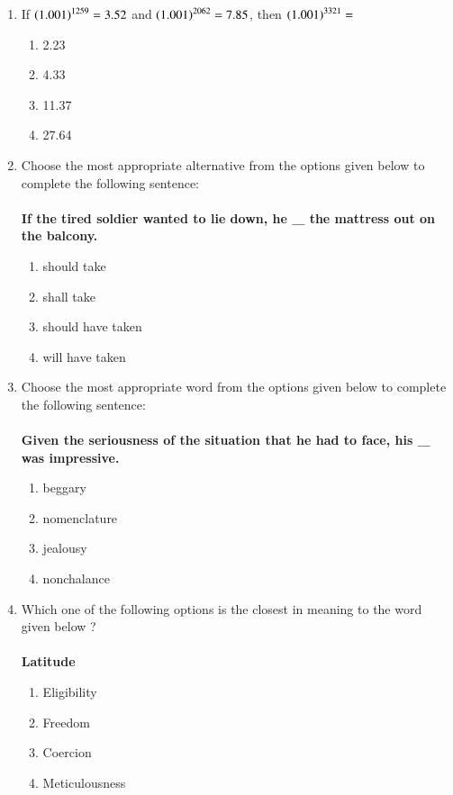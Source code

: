 \documentclass[journal]{IEEEtran}
\begin{document}
\begin{enumerate}
\begin{enumerate}
 \end{enumerate}
\item If $\left(1.001\right)^{1259} = 3.52$ and $\left(1.001\right)^{2062} = 7.85$, then $\left(1.001\right)^{3321} = $
\begin{enumerate}
   \item 2.23
   \item 4.33
   \item 11.37
   \item 27.64 \\
\end{enumerate}
\item Choose the most appropriate alternative from the options given below to complete the following sentence:\\\\
\textbf{If the tired soldier wanted to lie down, he $\_\_\_$ the mattress out on the balcony.}
\begin{enumerate}
    \item should take
    \item shall take
    \item should have taken
    \item will have taken \\
\end{enumerate}
\item Choose the most appropriate word from the options given below to complete the following sentence: \\\\
\textbf{Given the seriousness of the situation that he had to face, his $\_\_\_$ was impressive.}
\begin{enumerate}
    \item beggary
    \item nomenclature 
    \item jealousy
    \item nonchalance \\
\end{enumerate}
\item Which one of the following options is the closest in meaning to the word given below ? \\\\
\textbf{Latitude}
\begin{enumerate}
    \item Eligibility
    \item Freedom
    \item Coercion
    \item Meticulousness  \\

\end{enumerate}
\end{enumerate}
\end{document}
